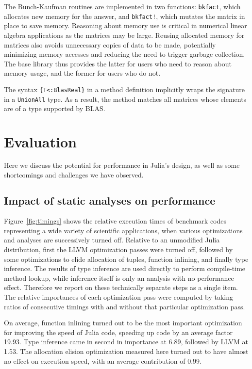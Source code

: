\documentclass[10pt, preprint]{sigplanconf}
\begin{document}
The Bunch-Kaufman routines are implemented in two functions: \verb|bkfact|,
which allocates new memory for the answer, and \verb|bkfact!|, which mutates
the matrix in place to save memory. Reasoning about memory use is critical in
numerical linear algebra applications as the matrices may be large.
Reusing allocated memory for matrices also avoids unnecessary copies of data to
be made, potentially minimizing memory accesses and reducing the need to
trigger garbage collection. The base library thus provides the latter for users
who need to reason about memory usage, and the former for users who do not.

The syntax \verb|{T<:BlasReal}| in a method definition implicitly wraps the
signature in a \verb|UnionAll| type. As a result, the method matches all
matrices whose elements are of a type supported by BLAS.





\section{Evaluation}

Here we discuss the potential for performance in Julia's design,
as well as some shortcomings and challenges we have observed.

\subsection{Impact of static analyses on performance}

Figure~\ref{fig:timings} shows the relative execution times of benchmark codes
representing a wide variety of scientific applications, when various optimizations
and analyses are successively turned off. Relative to an unmodified Julia
distribution, first the LLVM optimization passes were turned off, followed by
some optimizations to elide allocation of tuples, function inlining, and finally
type inference. The results of type inference are used directly to perform
compile-time method lookup, while inference itself is only an analysis with
no performance effect. Therefore
we report on these technically separate steps as a single item.
The relative
importances of each optimization pass were computed by taking ratios of
consecutive timings with and without that particular optimization pass.

On average, function inlining turned out to be the most important optimization
for improving the speed of Julia code, speeding up code by an average factor
19.93. Type inference came in second in importance at 6.89, followed by LLVM at
1.53. The allocation elision optimization measured here turned
out to have almost no effect on execution speed, with an average contribution
of 0.99.
\end{document}
